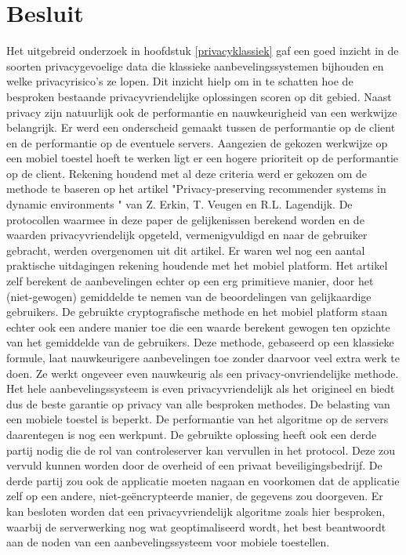 \chapter{Besluit}


Het uitgebreid onderzoek in hoofdstuk \ref{privacyklassiek} gaf een goed inzicht in de soorten privacygevoelige data die klassieke aanbevelingssystemen bijhouden en welke privacyrisico's ze lopen. Dit inzicht hielp om in te schatten hoe de besproken bestaande privacyvriendelijke oplossingen scoren op dit gebied. Naast privacy zijn natuurlijk ook de performantie en nauwkeurigheid van een werkwijze belangrijk. Er werd een onderscheid gemaakt tussen de performantie op de client en de performantie op de eventuele servers. Aangezien de gekozen werkwijze op een mobiel toestel hoeft te werken ligt er een hogere prioriteit op de performantie op de client. Rekening houdend met al deze criteria werd er gekozen om de methode te baseren op het artikel "Privacy-preserving recommender systems in dynamic environments \cite{ZErkinDyn}" van Z. Erkin, T. Veugen en R.L. Lagendijk. De protocollen waarmee in deze paper de gelijkenissen berekend worden en de waarden privacyvriendelijk opgeteld, vermenigvuldigd en naar de gebruiker gebracht, werden overgenomen uit dit artikel. Er waren wel nog een aantal praktische uitdagingen rekening houdende met het mobiel platform. Het artikel zelf berekent de aanbevelingen echter op een erg primitieve manier, door het (niet-gewogen) gemiddelde te nemen van de beoordelingen van gelijkaardige gebruikers. De gebruikte cryptografische methode en het mobiel platform staan echter ook een andere manier toe die een waarde berekent gewogen ten opzichte van het gemiddelde van de gebruikers. Deze methode, gebaseerd op een klassieke formule, laat nauwkeurigere aanbevelingen toe zonder daarvoor veel extra werk te doen. Ze werkt ongeveer even nauwkeurig als een privacy-onvriendelijke methode. Het hele aanbevelingssysteem is even privacyvriendelijk als het origineel en biedt dus de beste garantie op privacy van alle besproken methodes. De belasting van een mobiele toestel is beperkt. De performantie van het algoritme op de servers daarentegen is nog een werkpunt. De gebruikte oplossing heeft ook een derde partij nodig die de rol van controleserver kan vervullen in het protocol. Deze zou vervuld kunnen worden door de overheid of een privaat beveiligingsbedrijf. De derde partij zou ook de applicatie moeten nagaan en voorkomen dat de applicatie zelf op een andere, niet-ge\"encrypteerde manier, de gegevens zou doorgeven. Er kan besloten worden dat een privacyvriendelijk algoritme zoals hier besproken, waarbij de serverwerking nog wat geoptimaliseerd wordt, het best beantwoordt aan de noden van een aanbevelingssysteem voor mobiele toestellen.
